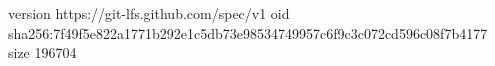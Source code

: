 version https://git-lfs.github.com/spec/v1
oid sha256:7f49f5e822a1771b292e1c5db73e98534749957c6f9c3c072cd596c08f7b4177
size 196704
